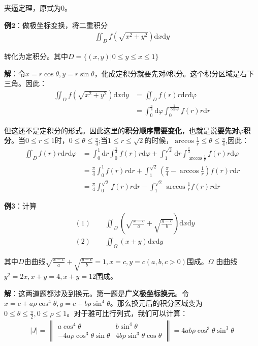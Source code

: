 \documentclass{ctexart}
\let\oldtextbf\textbf
\renewcommand{\textbf}[1]{\textcolor{brown!50!red}{\oldtextbf{#1}}}
\begin{document}
夹逼定理，原式为0。

\textbf{\color{brown!50!red}例2}：做极坐标变换，将二重积分
\begin{align*} 
\iint_D f(\sqrt{x^2+y^2})\mathrm{d}x\mathrm{d}y
\end{align*}

转化为定积分。其中$D=\{(x,y)| 0\leq y\leq x\leq 1\}$

\textbf{\color{brown!50!red}解}：令$x=r\cos\theta,y=r\sin\theta$，化成定积分就要先对$\theta$积分。这个积分区域是右下三角。因此：
\begin{align*} 
\iint_D f(\sqrt{x^2+y^2})\mathrm{d}x\mathrm{d}y&=\iint_Df(r)r\mathrm{d}r\mathrm{d}\varphi\\
&=\int_0^\frac{\pi}{4} \mathrm{d}\varphi\int_0^\frac{1}{\cos\varphi}f(r)r\mathrm{d}r
\end{align*}

但这还不是定积分的形式。因此这里的\textbf{\color{brown!50!red}积分顺序需要变化}，也就是说\textbf{\color{brown!50!red}要先对$\varphi$积分}。当$0\leq r\leq 1$时，$ 0\leq\theta\leq\frac{\pi}{4}$;当$1 \leq r \leq \sqrt{2}$的时候，$\arccos{\frac{1}{r}}\leq\theta\leq\frac{\pi}{4}$,因此：
\begin{align*} 
\iint_Df(r)r\mathrm{d}r\mathrm{d}\varphi
&=\int_0^1 \mathrm{d}r\int_0^\frac{\pi}{4} f(r)r\mathrm{d}\varphi+
\int_1^{\sqrt{2}}\mathrm{d}r\int_{\arccos \frac{1}{r}}^\frac{\pi}{4}f(r)r\mathrm{d}\varphi\\
 &=\frac{\pi}{4}\int_0^1 f(r)r\mathrm{d} r+\int_1^{\sqrt{2}}(\frac{\pi}{4}-\arccos \frac{1}{r})f(r)r\mathrm{d}r\\
&=\frac{\pi}{4}\int_0^{\sqrt{2}}f(r)r\mathrm{d}r-  \int_1^{\sqrt{2}}\arccos{\frac{1}{r}}f(r)r\mathrm{d}r
\end{align*}

\textbf{\color{brown!50!red}例3}：计算
\begin{align*} 
&(1)\qquad\iint_D\left(\sqrt{\frac{x-c}{a}}+\sqrt{\frac{y-c}{b}}\right)\mathrm{d}x\mathrm{d}y\\
&(2)\qquad\iint_\Omega(x+y)\mathrm{d}x\mathrm{d}y
\end{align*}

其中$D$由曲线$\sqrt{\frac{x-c}{a}}+\sqrt{\frac{y-c}{b}}=1,x=c,y=c(a,b,c>0)$围成。$\Omega$ 由曲线 $y^2=2x,x+y=4,x+y=12$围成。

\textbf{\color{brown!50!red}解}：这两道题都涉及到换元。第一题是\textbf{\color{brown!50!red}广义极坐标换元}。令$x=c+a\rho\cos^4\theta,y=c+b\rho\sin^4\theta$。那么换元后的积分区域变为$0\leq\theta\leq\frac{\pi}{2},0\leq\rho\leq1$。对于雅可比行列式，我们可以计算：
\begin{align*} 
|J|=\begin{Vmatrix}
 a\cos^4\theta & b\sin^4\theta \\
 -4a\rho\cos^3\theta\sin\theta & 4b\rho\sin^3\theta\cos\theta
\end{Vmatrix}=4ab\rho\cos^3\theta\sin^3\theta
\end{align*}
\end{document}
